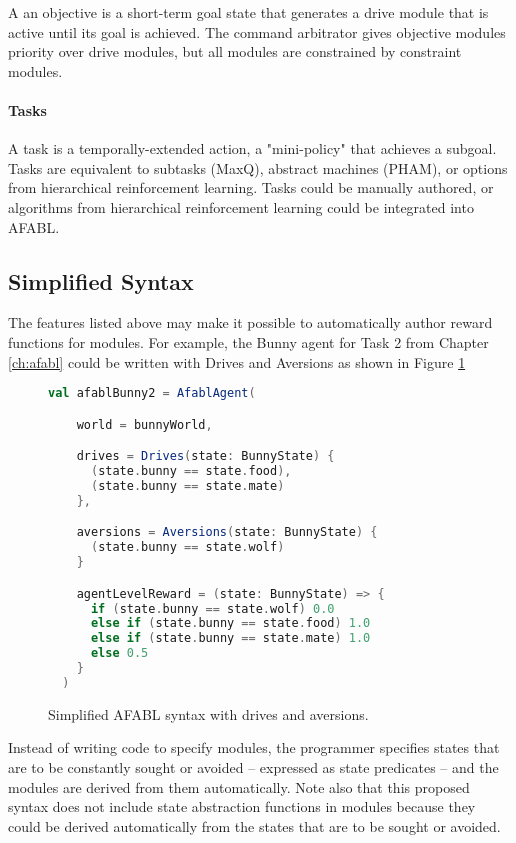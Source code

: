 A an objective is a short-term goal state that generates a drive module that is active until its goal is achieved.  The command arbitrator gives objective modules priority over drive modules, but all modules are constrained by constraint modules.

\paragraph{Tasks}

A task is a temporally-extended action, a "mini-policy" that achieves a subgoal.  Tasks are equivalent to subtasks (MaxQ), abstract machines (PHAM), or options from hierarchical reinforcement learning. Tasks could be manually authored, or algorithms from hierarchical reinforcement learning could be integrated into AFABL.

\subsection{Simplified Syntax}

The features listed above may make it possible to automatically author reward functions for modules. For example, the Bunny agent for Task 2 from Chapter \ref{ch:afabl} could be written with Drives and Aversions as shown in Figure \ref{fig:simplified-afabl}


\begin{figure}[!h]
\begin{center}

\begin{lstlisting}[language=Scala]
  val afablBunny2 = AfablAgent(

    world = bunnyWorld,

    drives = Drives(state: BunnyState) {
      (state.bunny == state.food),
      (state.bunny == state.mate)
    },

    aversions = Aversions(state: BunnyState) {
      (state.bunny == state.wolf)
    }

    agentLevelReward = (state: BunnyState) => {
      if (state.bunny == state.wolf) 0.0
      else if (state.bunny == state.food) 1.0
      else if (state.bunny == state.mate) 1.0
      else 0.5
    }
  )
\end{lstlisting}

\caption{Simplified AFABL syntax with drives and aversions.}
\end{center}
\label{fig:simplified-afabl}
\end{figure}


Instead of writing code to specify modules, the programmer specifies states that are to be constantly sought or avoided -- expressed as state predicates -- and the modules are derived from them automatically. Note also that this proposed syntax does not include state abstraction functions in modules because they could be derived automatically from the states that are to be sought or avoided.

